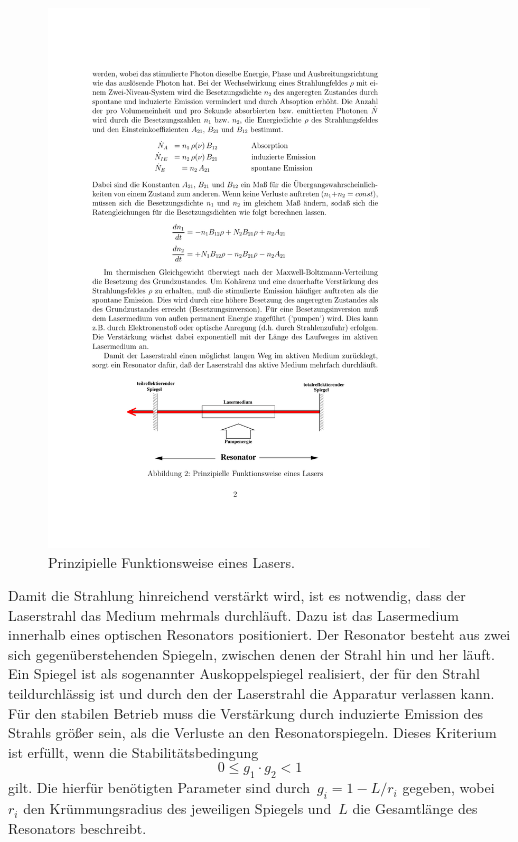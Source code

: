 \begin{figure}[htb]
  \centering
  \includegraphics[width=0.9\textwidth]{figures/fig_Resonator.pdf}
  \caption{Prinzipielle Funktionsweise eines Lasers.}
  \label{fig:Resonator}
\end{figure}

Damit die Strahlung hinreichend verstärkt wird, ist es notwendig, dass der
Laserstrahl das Medium mehrmals durchläuft. Dazu ist das Lasermedium innerhalb
eines optischen Resonators positioniert. Der Resonator besteht aus zwei sich
gegenüberstehenden Spiegeln, zwischen denen der Strahl hin und her läuft. Ein
Spiegel ist als sogenannter Auskoppelspiegel realisiert, der für den Strahl
teildurchlässig ist und durch den der Laserstrahl die Apparatur verlassen kann.
Für den stabilen Betrieb muss die Verstärkung durch induzierte Emission des
Strahls größer sein, als die Verluste an den Resonatorspiegeln. Dieses Kriterium
ist erfüllt, wenn die Stabilitätsbedingung
%
\begin{equation}
  0\leq g_1\cdot g_2<1
  \label{eq:bedingung}
\end{equation}
%
gilt. Die hierfür benötigten Parameter sind durch~$g_i=1-L/r_i$ gegeben,
wobei~$r_i$ den Krümmungsradius des jeweiligen Spiegels und~$L$ die Gesamtlänge
des Resonators beschreibt.

